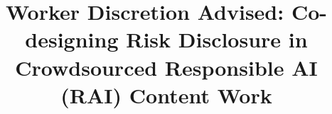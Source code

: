 \documentclass[manuscript, review, anonymous]{acmart}
\begin{document}
\renewcommand{\shortauthors}{Alice Qian Zhang, et al.}






\title[Worker Discretion Advised]{Worker Discretion Advised: Co-designing Risk Disclosure in Crowdsourced Responsible AI (RAI) Content Work}

\maketitle














% 
\end{document}

